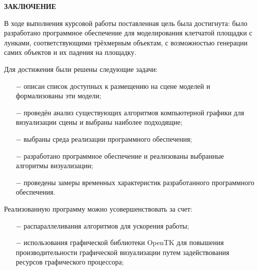 \begin{center}
    \textbf{ЗАКЛЮЧЕНИЕ}
\end{center}

В ходе выполнения курсовой работы поставленная цель была достигнута: было разработано программное обеспечение для моделирования клетчатой площадки с лунками, соответствующими трёхмерным объектам, с возможностью генерации самих объектов и их падения на площадку.

Для достижения были решены следующие задачи:
\begin{itemize}
    \item[$-$] описан список доступных к размещению на сцене моделей и формализованы эти модели;
    \item[$-$] проведён анализ существующих алгоритмов компьютерной графики для визуализации сцены и выбраны наиболее подходящие;
    \item[$-$] выбраны среда реализации программного обеспечения;
    \item[$-$] разработано программное обеспечение и реализованы выбранные алгоритмы визуализации;
    \item[$-$] проведены замеры временных характеристик разработанного программного обеспечения.
\end{itemize}

\vspace{5mm}

Реализованную программу можно усовершенствовать за счет:
\begin{itemize}
    \item[$-$] распараллеливания алгоритмов для ускорения работы;
    \item[$-$] использования графической библиотеки OpenTK для повышения производительности графической визуализации путем задействования ресурсов графического процессора;
\end{itemize}